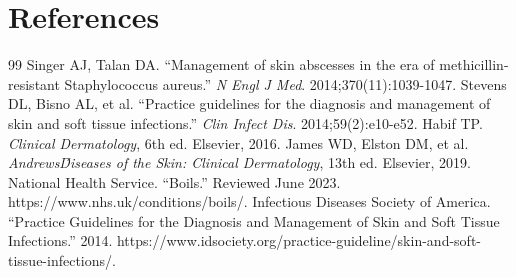 \section*{References}
\begin{thebibliography}{99}
 Singer AJ, Talan DA. ``Management of skin abscesses in the era of methicillin-resistant Staphylococcus aureus.'' \textit{N Engl J Med}. 2014;370(11):1039-1047.
 Stevens DL, Bisno AL, et al. ``Practice guidelines for the diagnosis and management of skin and soft tissue infections.'' \textit{Clin Infect Dis}. 2014;59(2):e10-e52.
 Habif TP. \textit{Clinical Dermatology}, 6th ed. Elsevier, 2016.
 James WD, Elston DM, et al. \textit{Andrews\' Diseases of the Skin: Clinical Dermatology}, 13th ed. Elsevier, 2019.
 National Health Service. ``Boils.'' Reviewed June 2023. https://www.nhs.uk/conditions/boils/.
 Infectious Diseases Society of America. ``Practice Guidelines for the Diagnosis and Management of Skin and Soft Tissue Infections.'' 2014. https://www.idsociety.org/practice-guideline/skin-and-soft-tissue-infections/.
\end{thebibliography}
